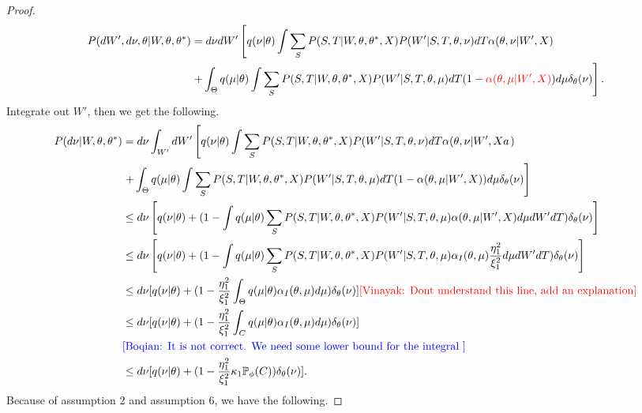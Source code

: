 \begin{proof}
\begin{align*}
P(dW', d\nu, \theta | W, \theta, \theta^*) &=d\nu dW' \left[q(\nu | \theta) \int \sum_S P(S, T | W, \theta, \theta^*, X)P(W' | S, T, \theta, \nu)dT\alpha(\theta, \nu | W', X)\right. \\
                                           &\left.+ \int_\Theta q(\mu | \theta) \int \sum_S P(S, T | W, \theta, \theta^*, X)P(W' | S, T, \theta, \mu)dT ( 1 - {\color{red} \alpha(\theta, \mu | W', X)})d\mu \delta_\theta(\nu)\right].
\end{align*}
Integrate out $W'$, then we get the following.
\begin{align*}
P(d\nu| W, \theta, \theta^*) &=d\nu \int_{W'}dW' \left[q(\nu | \theta) \int \sum_S P(S, T | W, \theta, \theta^*, X)P(W' | S, T, \theta, \nu)dT\alpha(\theta, \nu | W', Xa\right.)\\
&\left. + \int_\Theta q(\mu | \theta) \int \sum_S P(S, T | W, \theta, \theta^*, X)P(W' | S, T, \theta, \mu)dT ( 1 - \alpha(\theta, \mu | W', X))d\mu \delta_\theta(\nu)\right]\\
&\leq d\nu\left[q(\nu | \theta) +(1 -  \int q(\mu | \theta) \sum_S P(S, T|W, \theta, \theta^*, X)P(W'|S, T, \theta, \mu)\alpha(\theta, \mu | W', X)d\mu dW' dT) \delta_\theta(\nu)\right]\\
& \leq d\nu\left[q(\nu | \theta) +(1 -  \int q(\mu | \theta) \sum_S P(S, T|W, \theta, \theta^*, X)P(W'|S, T, \theta, \mu)\alpha_I(\theta, \mu) \frac{\eta_1^2}{\xi_1^2}d\mu dW' dT) \delta_\theta(\nu)\right]\\                              
                             & \leq d\nu [q(\nu | \theta) + (1 - \frac{\eta_1^2}{\xi_1^2} \int_\Theta q(\mu | \theta)\alpha_I(\theta, \mu)d\mu)\delta_\theta(\nu)] \text{\textcolor{red}{[Vinayak: Dont understand this line, add an explanation]}}\\
& \leq d\nu [q(\nu | \theta) + (1 - \frac{\eta_1^2}{\xi_1^2} \int_C q(\mu | \theta)\alpha_I(\theta, \mu)d\mu)\delta_\theta(\nu)]\\
& \text{\textcolor{blue}{[Boqian: It is not correct. We need some lower bound for the integral ]}}\\
& \leq d\nu [q(\nu | \theta) + (1 - \frac{\eta_1^2}{\xi_1^2} \kappa_1 \mathbb{P}_\phi(C))\delta_\theta(\nu)].
\end{align*}
Because of assumption 2 and assumption 6, we have the following.

\end{proof}
